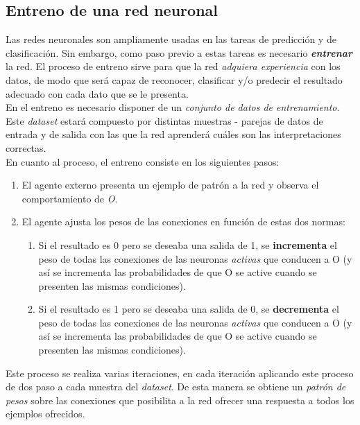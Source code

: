 \subsection{Entreno de una red neuronal}

Las redes neuronales son ampliamente usadas en las tareas de predicción y de clasificación. Sin embargo, como paso previo a estas tareas es necesario \textit{\textbf{entrenar}} la red. El proceso de entreno sirve para que la red \textit{adquiera experiencia} con los datos, de modo que será capaz de reconocer, clasificar y/o predecir el resultado adecuado con cada dato que se le presenta. \\

En el entreno es necesario disponer de un \textit{conjunto de datos de entrenamiento}. Este \textit{dataset} estará compuesto por distintas muestras - parejas de datos de entrada y de salida con las que la red aprenderá cuáles son las interpretaciones correctas. \\

En cuanto al proceso, el entreno consiste en los siguientes pasos: 
\begin{enumerate}
    \item El agente externo presenta un ejemplo de patrón a la red y observa el comportamiento de \textit{O}.
    \item El agente ajusta los pesos de las conexiones en función de estas dos normas:
        \begin{enumerate}
        \item Si el resultado es 0 pero se deseaba una salida de 1, se \textbf{incrementa} el peso de todas las conexiones de las neuronas \textit{activas} que conducen a O (y así se incrementa las probabilidades de que O se active cuando se presenten las mismas condiciones).
        \item Si el resultado es 1 pero se deseaba una salida de 0, se \textbf{decrementa} el peso de todas las conexiones de las neuronas \textit{activas} que conducen a O (y así se incrementa las probabilidades de que O se active cuando se presenten las mismas condiciones).
    \end{enumerate}
\end{enumerate}

Este proceso se realiza varias iteraciones, en cada iteración aplicando este proceso de dos paso a cada muestra del \textit{dataset}. De esta manera se obtiene un \textit{patrón de pesos} sobre las conexiones que posibilita a la red ofrecer una respuesta a todos los ejemplos ofrecidos. \\